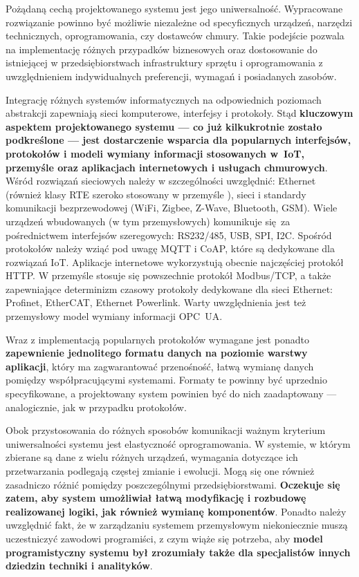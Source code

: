 \documentclass[a4paper, 12pt, twoside]{article}
\begin{document}
Pożądaną cechą projektowanego systemu jest jego uniwersalność. Wypracowane rozwiązanie
powinno być możliwie niezależne od specyficznych urządzeń, narzędzi technicznych,
oprogramowania, czy dostawców chmury. Takie podejście pozwala na implementację różnych przypadków biznesowych
oraz dostosowanie do istniejącej w przedsiębiorstwach infrastruktury sprzętu i oprogramowania
z uwzględnieniem indywidualnych preferencji, wymagań i posiadanych zasobów.

Integrację różnych systemów informatycznych na odpowiednich poziomach abstrakcji
zapewniają sieci komputerowe, interfejsy i protokoły.
Stąd \textbf{kluczowym aspektem projektowanego systemu --- co już kilkukrotnie zostało podkreślone ---
      jest dostarczenie wsparcia dla popularnych
      interfejsów, protokołów i modeli wymiany informacji stosowanych w~IoT, przemyśle oraz
      aplikacjach internetowych i usługach chmurowych}. Wśród rozwiązań sieciowych
należy w szczególności uwzględnić: Ethernet (również klasy RTE szeroko stosowany
w przemyśle \cite{isp}), sieci i standardy komunikacji bezprzewodowej (WiFi, Zigbee, Z-Wave, Bluetooth, GSM).
Wiele urządzeń wbudowanych (w tym przemysłowych) komunikuje się za pośrednictwem
interfejsów szeregowych: RS232/485, USB, SPI, I2C. Spośród protokołów należy
wziąć pod uwagę MQTT i CoAP, które są dedykowane dla rozwiązań IoT. Aplikacje
internetowe wykorzystują obecnie najczęściej protokół HTTP. W przemyśle
stosuje się powszechnie protokół Modbus/TCP, a także zapewniające determinizm czasowy
protokoły dedykowane dla sieci Ethernet: Profinet, EtherCAT, Ethernet Powerlink.
Warty uwzględnienia jest też przemysłowy model wymiany informacji OPC~UA.

Wraz z implementacją popularnych protokołów wymagane jest ponadto \textbf{zapewnienie
      jednolitego formatu danych na poziomie warstwy aplikacji}, który ma zagwarantować przenośność,
łatwą wymianę danych pomiędzy współpracującymi systemami. Formaty
te powinny być uprzednio specyfikowane, a projektowany system powinien być do
nich zaadaptowany --- analogicznie, jak w przypadku protokołów.

Obok przystosowania do różnych sposobów komunikacji ważnym kryterium uniwersalności
systemu jest elastyczność oprogramowania.
W systemie, w którym zbierane są dane z wielu różnych urządzeń, wymagania dotyczące
ich przetwarzania podlegają częstej zmianie i ewolucji. Mogą się one również
zasadniczo różnić pomiędzy poszczególnymi przedsiębiorstwami. \textbf{Oczekuje się zatem,
      aby system umożliwiał łatwą modyfikację i rozbudowę realizowanej logiki, jak
      również wymianę komponentów}. Ponadto należy uwzględnić fakt, że w zarządzaniu
systemem przemysłowym niekoniecznie muszą uczestniczyć zawodowi programiści,
z czym wiąże się potrzeba, aby \textbf{model programistyczny systemu był zrozumiały
      także dla specjalistów innych dziedzin techniki i analityków}.
\end{document}
